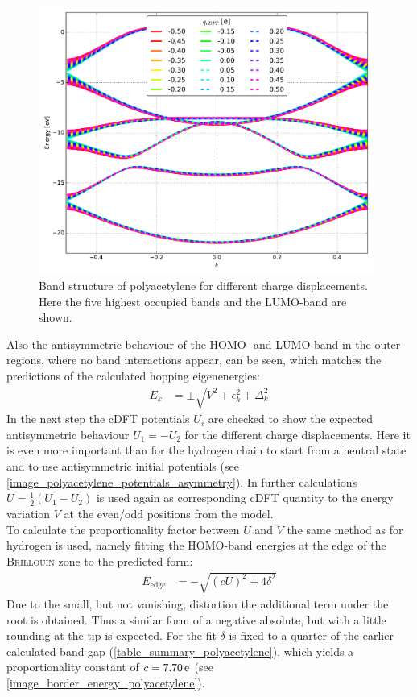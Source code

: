 \begin{figure}
	\centering
	\includegraphics[width = 11cm]{Images/polyacetylene/charging/band_structure_q_1}
	\caption{Band structure of polyacetylene for different charge displacements. Here the five highest occupied bands and the LUMO-band are shown.}
	\label{image_polyacetylene_band_structure_charging}
\end{figure}
Also the antisymmetric behaviour of the HOMO- and LUMO-band in the outer regions, where no band interactions appear, can be seen, which matches the predictions of the calculated hopping eigenenergies:
\begin{align}
	E_k &= \pm \sqrt{V^2+\epsilon_k^2+\Delta_k^2}
\end{align}
In the next step the cDFT potentials $U_i$ are checked to show the expected antisymmetric behaviour $U_1 = -U_2$ for the different charge displacements. Here it is even more important than for the hydrogen chain to start from a neutral state and to use antisymmetric initial potentials (see \cref{image_polyacetylene_potentials_asymmetry}). In further calculations $U = \frac{1}{2}(U_1 - U_2)$ is used again as corresponding cDFT quantity to the energy variation $V$ at the even/odd positions from the model.\\
To calculate the proportionality factor between $U$ and $V$ the same method as for hydrogen is used, namely fitting the HOMO-band energies at the edge of the \textsc{Brillouin} zone to the predicted form:
\begin{align}
	E_\text{edge} &= -\sqrt{\left(cU\right)^2 + 4 \delta^2}
\end{align}
Due to the small, but not vanishing, distortion the additional term under the root is obtained. Thus a similar form of a negative absolute, but with a little rounding at the tip is expected. For the fit $\delta$ is fixed to a quarter of the earlier calculated band gap (\cref{table_summary_polyacetylene}), which yields a proportionality constant of $c = \unit[7.70]{e}$ (see \cref{image_border_energy_polyacetylene}).\\
